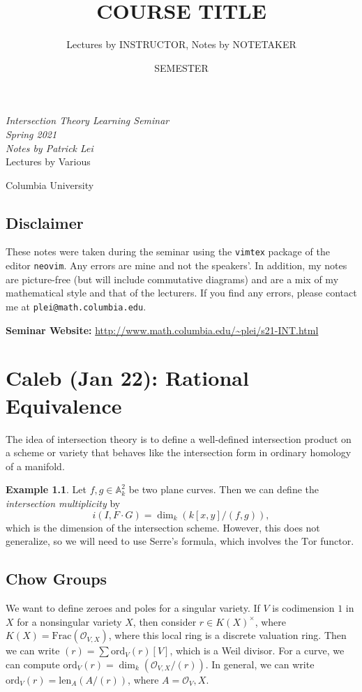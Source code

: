 \documentclass[leqno, openany]{memoir}
\title{COURSE TITLE}
\author{Lectures by INSTRUCTOR, Notes by NOTETAKER}
\date{SEMESTER}
\theoremstyle{definition}
\newtheorem{exm}[thm]{Example}
\theoremstyle{remark}
\theoremstyle{plain}
\theoremstyle{definition}
\theoremstyle{remark}
\newcommand{\A}{\mathbb{A}}
\newcommand{\msc}[1]{\mathscr{#1}}
\newcommand{\mr}[1]{\mathrm{#1}}
\newcommand*{\titleSW}
    {\begingroup%
    \raggedleft
    \vspace*{\baselineskip}
    {\Huge\itshape Intersection Theory Learning Seminar \\ Spring 2021}\\[\baselineskip]
    {\large\itshape Notes by Patrick Lei}\\[0.2\textheight]
    {\Large Lectures by Various}\par
    \vfill
    {\Large \sffamily Columbia University}
    \vspace*{\baselineskip}
\endgroup}
\begin{document}
    
\begin{titlingpage}
\titleSW
\end{titlingpage}

\thispagestyle{empty}
\section*{Disclaimer}%
\label{sec:disclaimer}

These notes were taken during the seminar using the \texttt{vimtex} package of the editor \texttt{neovim}. 
Any errors are mine and not the speakers'. 
In addition, my notes are picture-free (but will include commutative diagrams) and are a mix of my mathematical style and that of the lecturers.
If you find any errors, please contact me at \texttt{plei@math.columbia.edu}.

\vspace*{1cm}

\noindent\textbf{Seminar Website:}  \url{http://www.math.columbia.edu/~plei/s21-INT.html}
\newpage


\tableofcontents

\chapter{Caleb (Jan 22): Rational Equivalence}%
\label{cha:caleb_jan_22_rational_equivalence}

The idea of intersection theory is to define a well-defined intersection product on a scheme or variety that behaves like the intersection form in ordinary homology of a manifold.

\begin{exm}
    Let $f, g \in \A_k^2$ be two plane curves. Then we can define the \textit{intersection multiplicity} by
    \[ i(I, F \cdot G) = \dim_k (k[x,y] / (f,g)), \]
    which is the dimension of the intersection scheme. However, this does not generalize, so we will need to use Serre's formula, which involves the $\mr{Tor}$ functor.
\end{exm}

\section{Chow Groups}%
\label{sec:chow_groups}

We want to define zeroes and poles for a singular variety. If $V$ is codimension $1$ in $X$ for a nonsingular variety $X$, then consider $r \in {K(X)}^{\times}$, where $K(X) = \mr{Frac}(\msc{O}_{V,X})$, where this local ring is a discrete valuation ring. Then we can write $(r) = \sum \mr{ord}_V(r) [V]$, which is a Weil divisor. For a curve, we can compute $\mr{ord}_V(r) = \dim_k (\msc{O}_{V,X} / (r))$. In general, we can write $\mr{ord}_V(r) = \mr{len}_A(A/(r))$, where $A = \msc{O}_V,X$.
\end{document}
